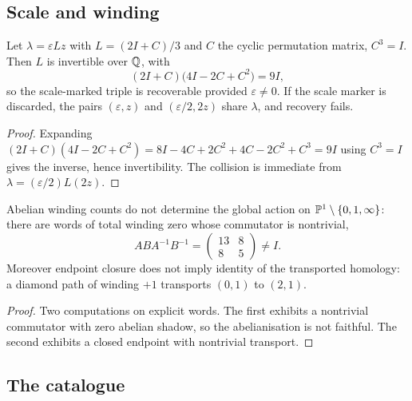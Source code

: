 \subsection{Scale and winding}

\begin{proposition}\label{prop:scale-forgetting}
Let $\lambda=\varepsilon Lz$ with $L=(2I+C)/3$ and $C$ the cyclic permutation matrix,
$C^{3}=I$.  Then $L$ is invertible over $\mathbb{Q}$, with
\[
  (2I+C)\bigl(4I-2C+C^{2}\bigr)=9I ,
\]
so the scale-marked triple is recoverable provided $\varepsilon\neq0$.  If the scale
marker is discarded, the pairs $(\varepsilon,z)$ and $(\varepsilon/2,2z)$ share $\lambda$,
and recovery fails.
\end{proposition}

\begin{proof}
Expanding $(2I+C)(4I-2C+C^{2})=8I-4C+2C^{2}+4C-2C^{2}+C^{3}=9I$ using $C^{3}=I$ gives the
inverse, hence invertibility.  The collision is immediate from
$\lambda=(\varepsilon/2)L(2z)$.
\end{proof}

\begin{nogo}\label{nogo:winding}
Abelian winding counts do not determine the global action on
$\mathbb{P}^{1}\setminus\{0,1,\infty\}$: there are words of total winding zero whose commutator is
nontrivial,
\[
  ABA^{-1}B^{-1}=\begin{pmatrix}13&8\\ 8&5\end{pmatrix}\neq I .
\]
Moreover endpoint closure does not imply identity of the transported homology: a diamond
path of winding $+1$ transports $(0,1)$ to $(2,1)$.
\end{nogo}

\begin{proof}
Two computations on explicit words.  The first exhibits a nontrivial commutator with zero
abelian shadow, so the abelianisation is not faithful.  The second exhibits a closed
endpoint with nontrivial transport.
\end{proof}

\subsection{The catalogue}


